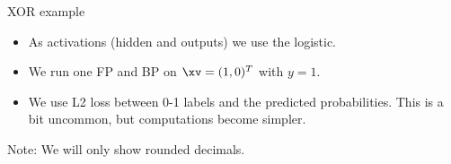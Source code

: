 

\begin{vbframe}{XOR example}
  \begin{itemize}
    \item As activations (hidden and outputs) we use the logistic.
    \item We run one FP and BP on $\xv = (1,0)^T$ with $y=1$.
    \item We use L2 loss between 0-1 labels and the predicted probabilities.
        This is a bit uncommon, but computations become simpler.
  \end{itemize}
  \begin{figure}
    \centering
  \end{figure}
\begin{footnotesize}
  Note: We will only show rounded decimals. 
\end{footnotesize}
\end{vbframe} 


